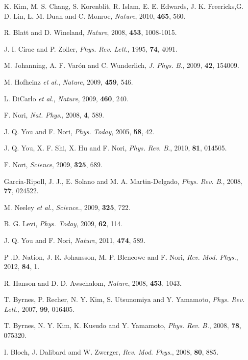 \documentclass[8.5pt,twoside,twocolumn]{article}
\begin{document}
\begin{thebibliography}{99}
K. Kim, M. S. Chang, S. Korenblit, R. Islam, E. E. Edwards, J. K. Freericks,G. D. Lin, L. M. Duan and C. Monroe, \emph{Nature}, 2010, \textbf{465}, 560.

R. Blatt and D. Wineland, \emph{Nature}, 2008, \textbf{453}, 1008-1015.

J. I. Cirac and P. Zoller, \emph{Phys. Rev. Lett}., 1995, \textbf{74}, 4091.

M. Johanning, A. F. Var\'{o}n and C. Wunderlich, \emph{J. Phys. B}., 2009, \textbf{42}, 154009.

M. Hofheinz \emph{et al.}, \emph{Nature}, 2009, \textbf{459}, 546.

L. DiCarlo \emph{et al.}, \emph{Nature}, 2009, \textbf{460}, 240.

F. Nori, \emph{Nat. Phys}., 2008, \textbf{4}, 589.

J. Q. You and F. Nori, \emph{Phys. Today}, 2005, \textbf{58}, 42.

J. Q. You, X. F. Shi, X. Hu and F. Nori, \emph{Phys. Rev. B}., 2010, \textbf{81}, 014505.

F. Nori, \emph{Science}, 2009, \textbf{325}, 689.

Garcia-Ripoll, J. J., E. Solano and M. A. Martin-Delgado, \emph{Phys. Rev. B}., 2008, \textbf{77}, 024522.

M. Neeley \emph{et al.}, \emph{Science}., 2009, \textbf{325}, 722.

B. G. Levi, \emph{Phys. Today}, 2009, \textbf{62}, 114.

J. Q. You and F. Nori, \emph{Nature}, 2011, \textbf{474}, 589.

P .D. Nation, J. R. Johansson, M. P. Blencowe and F. Nori, \emph{Rev. Mod. Phys.}, 2012, \textbf{84}, 1.

R. Hanson and D. D. Awschalom, \emph{Nature}, 2008, \textbf{453}, 1043.

T. Byrnes, P. Recher, N. Y. Kim, S. Utsunomiya and Y. Yamamoto, \emph{Phys. Rev. Lett.}, 2007, \textbf{99}, 016405.

T. Byrnes, N. Y. Kim, K. Kusudo and Y. Yamamoto, \emph{Phys. Rev. B.}, 2008, \textbf{78}, 075320.

I. Bloch, J. Dalibard amd W. Zwerger, \emph{Rev. Mod. Phys.}, 2008, \textbf{80}, 885.


\end{thebibliography}
\end{document}
